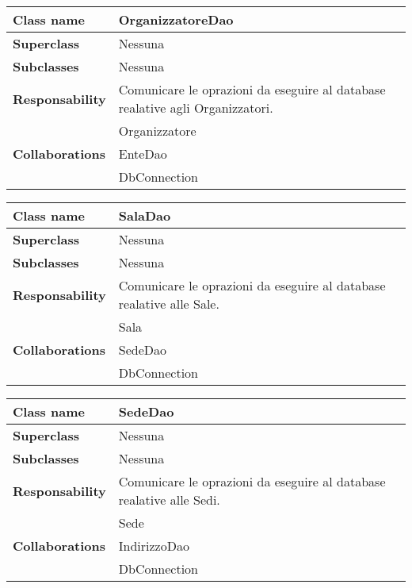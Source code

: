 \newpage
\begin{table}[h!]
	\begin{tabular}{|l|l|}
		\hline 
		\textbf{Class name} & OrganizzatoreDao
		\\ \hline
		\textbf{Superclass} & Nessuna
		\\ \hline
		\multirow{1}{*}{\textbf{Subclasses}} & Nessuna
		\\ \hline
		\textbf{Responsability} & Comunicare le oprazioni da eseguire al database realative agli Organizzatori.
		\\ \hline
		\multirow{3}{*}{\textbf{Collaborations}} & Organizzatore \\ 
		& EnteDao \\
		& DbConnection \\ \hline
	\end{tabular}
\end{table}

\begin{table}[h!]
	\begin{tabular}{|l|l|}
		\hline 
		\textbf{Class name} & SalaDao
		\\ \hline
		\textbf{Superclass} & Nessuna
		\\ \hline
		\multirow{1}{*}{\textbf{Subclasses}} & Nessuna
		\\ \hline
		\textbf{Responsability} & Comunicare le oprazioni da eseguire al database realative alle Sale.
		\\ \hline
		\multirow{3}{*}{\textbf{Collaborations}} & Sala \\ 
		& SedeDao \\
		& DbConnection \\ \hline
	\end{tabular}
\end{table}

\begin{table}[h!]
	\begin{tabular}{|l|l|}
		\hline 
		\textbf{Class name} & SedeDao
		\\ \hline
		\textbf{Superclass} & Nessuna
		\\ \hline
		\multirow{1}{*}{\textbf{Subclasses}} & Nessuna
		\\ \hline
		\textbf{Responsability} & Comunicare le oprazioni da eseguire al database realative alle Sedi.
		\\ \hline
		\multirow{3}{*}{\textbf{Collaborations}} & Sede \\ 
		& IndirizzoDao \\
		& DbConnection \\ \hline
	\end{tabular}
\end{table}

